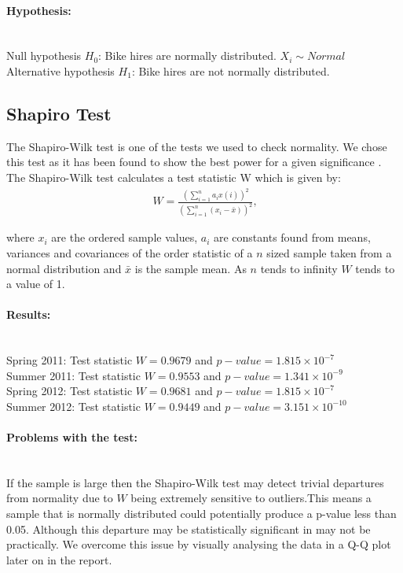 \paragraph{Hypothesis:} ~\\
Null hypothesis $H_0$: Bike hires are normally distributed. $X_i\sim Normal$ \\
Alternative hypothesis $H_1$: Bike hires are not normally distributed.

\subsection{Shapiro Test}
The Shapiro-Wilk test is one of the tests we used to check normality. We chose this test as it has been found to show the best power for a given significance \cite{shapiropower}. The Shapiro-Wilk test calculates a test statistic W which is given by: \\
\begin{eqnarray}
\ W = \frac{\left(\sum_{i=1}^{n} a_i x(i)\right)^2}{(\sum_{i=1}^{n} (x_i-\bar{x}))^2},
\end{eqnarray}

where $x_{i}$ are the ordered sample values, $a_i$ are constants found from means, variances and covariances of the order statistic of a $n$ sized sample taken from a normal distribution and $\bar{x}$ is the sample mean. As $n$ tends to infinity $W$ tends to a value of 1.  

\paragraph{Results:} ~\\
Spring 2011: Test statistic $W=0.9679$ and $p-value = 1.815\times10^{-7}$ \\
Summer 2011: Test statistic $W= 0.9553$ and $p-value = 1.341\times10^{-9}$ \\
Spring 2012: Test statistic $W=0.9681$ and $p-value = 1.815\times10^{-7}$ \\
Summer 2012: Test statistic $W= 0.9449$ and $p-value = 3.151\times10^{-10}$

\paragraph{Problems with the test:} ~\\
If the sample is large then the Shapiro-Wilk test may detect trivial departures from normality due to $W$ being extremely sensitive to outliers.This means a sample that is normally distributed could potentially produce a p-value less than 0.05. Although this departure may be statistically significant in may not be practically. We overcome this issue by visually analysing the data in a Q-Q plot later on in the report.  

